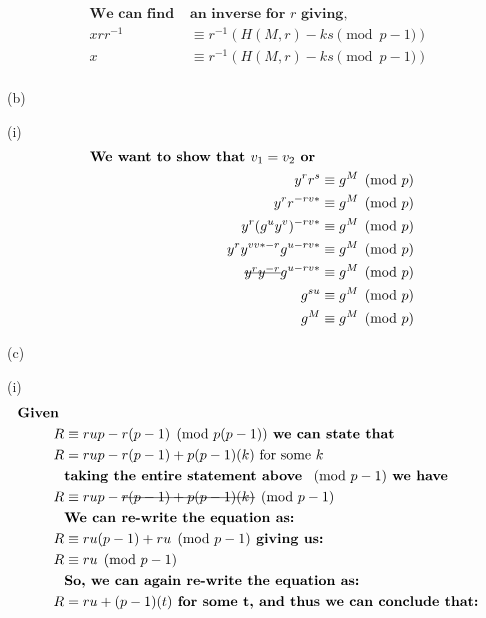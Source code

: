 \documentclass{assignment}
\begin{document}
\begin{flushleft}
\begin{problemlist}
\begin{align*}
\textbf{We can find }&\textbf{an inverse for } r \textbf{ giving, }\\
xrr^{-1} &\equiv r^{-1}(H(M,r) - ks \pmod{p-1})\\
x &\equiv r^{-1}(H(M,r) - ks \pmod{p-1})\\
\end{align*}
\item[(b)]\hspace{1cm}\\
\item[(i)]\hspace{1cm}\\
\begin{align*}
\textbf{We want to show that } v_1 = v_2 \textbf{ or }\\ y^{r} r^s &\equiv g^{M} \pmod{p}\\
y^{r} r^{-rv*} &\equiv g^{M}\pmod{p}\\
y^{r} (g^{u}y^{v})^{-rv*} &\equiv g^{M}\pmod{p}\\
y^{r}y^{vv*-r} g^{u-rv*} &\equiv g^{M}\pmod{p}\\
\text{\sout{$y^{r}y^{-r}$}} g^{u-rv*} &\equiv g^{M}\pmod{p}\\
g^{su} &\equiv g^{M}\pmod{p}\\
g^{M} &\equiv g^{M}\pmod{p}\\
\end{align*}
\item[(c)]\hspace{1cm}\\
\item[(i)]\hspace{1cm}\\
\begin{align*}
\textbf{Given }\\
R &\equiv rup-r(p-1) \pmod{p(p-1)}\textbf{ we can state that }\\
R &= rup -r(p-1) + p(p-1)(k)\text{ for some } k\\
&\textbf{taking the entire statement above } \pmod{p-1} \textbf{ we have}\\
R &\equiv rup -\text{\sout{$r(p-1) + p(p-1)(k)$}}\pmod{p-1}\\
&\textbf{We can re-write the equation as: }\\
R &\equiv ru(p-1) + ru \pmod{p-1}\textbf{ giving us: }\\
R &\equiv ru \pmod{p-1}\\
&\textbf{So, we can again re-write the equation as: }\\
R &= ru + (p-1)(t) \textbf{ for some t, and thus we can conclude that: }\\

\end{align*}
\end{problemlist}
\end{flushleft}
\end{document}
